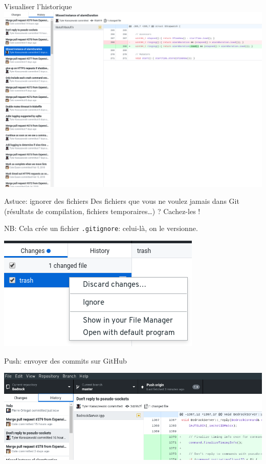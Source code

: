 \documentclass{beamer}
\begin{document}
\begin{frame}{Visualiser l'historique}
    \includegraphics[width=.9\textwidth]{img/github_desktop/historique.png}
\end{frame}

\begin{frame}{Astuce: ignorer des fichiers}
    Des fichiers que vous ne voulez jamais dans Git (résultats de compilation,
    fichiers temporaires\dots) ? Cachez-les !

    NB: Cela crée un fichier \texttt{.gitignore}: celui-là, on le versionne.
    \begin{center}
        \includegraphics[width=.5\textwidth]{img/github_desktop/ignore.png}
    \end{center}
\end{frame}

\begin{frame}{Push: envoyer des commits sur GitHub}
    \begin{center}
        \includegraphics[width=\textwidth]{img/github_desktop/push_2.png}
    \end{center}
\end{frame}
\end{document}

